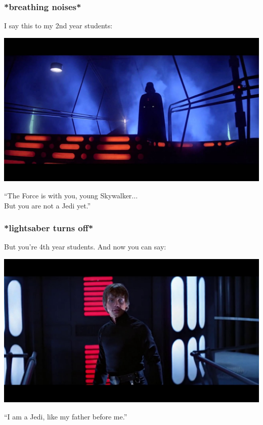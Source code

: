 \begin{frame}
\frametitle{*breathing noises*}

I say this to my 2nd year students:

\begin{center}
	\includegraphics[width=\textwidth]{images/vader.jpg}
\end{center}

``The Force is with you, young Skywalker...\\
\quad But you are not a Jedi yet.''


\end{frame}


\begin{frame}
\frametitle{*lightsaber turns off*}

But you're 4th year students. And now you can say:
\begin{center}
	\includegraphics[width=\textwidth]{images/skywalker.jpg}
\end{center}

``I am a Jedi, like my father before me.''

\end{frame}





